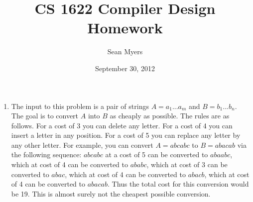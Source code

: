 \documentclass{article}
\title{CS 1622 Compiler Design Homework}
\author{Sean Myers}
\date{September 30, 2012}
\begin{document}
\maketitle

\begin{enumerate}
\item 
The input to this problem is a pair of strings $A=a_{1}...a_{m}$ and $B = b_{1} ... b_{n}$. The goal is to convert
\newline $A$ into $B$ as cheaply as possible. The rules are as follows. For a cost of 3 you can delete any letter.
\newline For a cost of 4 you can insert a letter in any position. For a cost of 5 you can replace any letter by
\newline any other letter. For example, you can convert $A= abcabc$ to $B = abacab$ via the following sequence:
\newline $abcabc$ at a cost of 5 can be converted to $abaabc$, which at cost of 4 can be converted to $ababc$, which
\newline at cost of 3 can be converted to $abac$, which at cost of 4 can be converted to $abacb$, which at cost of 4
\newline can be converted to $abacab$. Thus the total cost for this conversion would be 19. This is almost surely
\newline not the cheapest possible conversion.
\newline


\end{enumerate}
\end{document}
